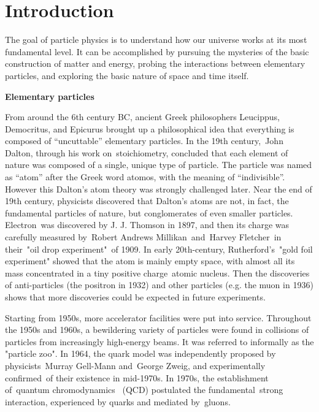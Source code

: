 
\chapter{Introduction}

The goal of particle physics is to understand how our universe works at its most fundamental level. It can be accomplished by pursuing the mysteries of the basic construction of matter and energy, probing the interactions between elementary particles, and exploring the basic nature of space and time itself. 

\textbf{Elementary particles}

From around the 6th century BC, ancient Greek philosophers Leucippus, Democritus, and Epicurus brought up a philosophical idea that everything is composed of “uncuttable” elementary particles. In the 19th century, John Dalton, through his work on stoichiometry, concluded that each element of nature was composed of a single, unique type of particle. The particle was named as “atom” after the Greek word atomos, with the meaning of “indivisible”. However this Dalton’s atom theory was strongly challenged later. Near the end of 19th century, physicists discovered that Dalton's atoms are not, in fact, the fundamental particles of nature, but conglomerates of even smaller particles. Electron was discovered by J. J. Thomson in 1897, and then its charge was carefully measured by Robert Andrews Millikan and Harvey Fletcher in their "oil drop experiment" of 1909. In early 20th-century, Rutherford's "gold foil experiment" showed that the atom is mainly empty space, with almost all its mass concentrated in a tiny positive charge atomic nucleus. Then the discoveries of anti-particles (the positron in 1932) and other particles (e.g. the muon in 1936) shows that more discoveries could be expected in future experiments.

Starting from 1950s, more accelerator facilities were put into service. Throughout the 1950s and 1960s, a bewildering variety of particles were found in collisions of particles from increasingly high-energy beams. It was referred to informally as the "particle zoo".
In 1964, the quark model was independently proposed by physicists Murray Gell-Mann and George Zweig, and experimentally confirmed of their existence in mid-1970s. In 1970s, the establishment of quantum chromodynamics  (QCD) postulated the fundamental strong interaction, experienced by quarks and mediated by gluons.


